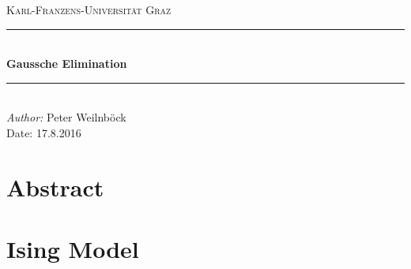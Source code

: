 \documentclass[a4paper]{article}
\title{\Title}
\author{\Author}
\date{\Date}
\newcommand{\HRule}{\rule{\linewidth}{0.2mm}}
\newcommand{\Title}{Gaussche Elimination}
\newcommand{\Date}{17.8.2016}
\begin{document}
\begin{titlepage}
\begin{center} 
\textsc{\large Karl-Franzens-Universität Graz}\\[3.0cm]

\HRule \\[0.5cm]
{ \Huge \bfseries \Title}\\[0.2cm]
\HRule \\[1.5cm]
\emph{Author:}
Peter Weilnböck\\[0.5cm]

\vfill
{\LARGE Date: \Date}
\end{center}
\end{titlepage}

\pagebreak

\tableofcontents
\pagebreak

\section*{Abstract}

\section{Ising Model}


\nocite{*}

\end{document}
